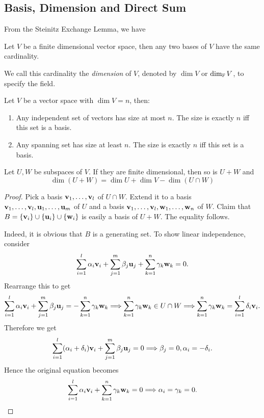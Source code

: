\documentclass[a4paper]{article}
\begin{document}
\subsection{Basis, Dimension and Direct Sum}
From the Steinitz Exchange Lemma, we have
\begin{corollary}\label{dim_well_defined}
    Let $V$ be a finite dimensional vector space, then any two bases of $V$ have the same cardinality.
\end{corollary}
We call this cardinality the \textit{dimension} of $V$, denoted by $ \dim V $ or $ \dim_{\mathbb{F}} V $, to specify the field.
\begin{corollary}
    Let $V$ be a vector space with $\dim V=n$, then:
    \begin{enumerate}
        \item Any independent set of vectors has size at most $n$.
        The size is exactly $n$ iff this set is a basis.
        \item Any spanning set has size at least $n$.
        The size is exactly $n$ iff this set is a basis.
    \end{enumerate}
\end{corollary}
\begin{proposition}
    Let $U,W$ be subspaces of $V$.
    If they are finite dimensional, then so is $U+W$ and
    $$\dim(U+W)=\dim U+\dim V-\dim(U\cap W)$$
\end{proposition}
\begin{proof}
    Pick a basis ${\bf v}_1,\ldots,{\bf v}_l$ of $U\cap W$.
    Extend it to a basis ${\bf v}_1,\ldots,{\bf v}_l,{\bf u}_1,\ldots,{\bf u}_m$ of $U$ and a basis ${\bf v}_1,\ldots,{\bf v}_l,{\bf w}_1,\ldots,{\bf w}_n$ of $W$. Claim that $B=\{{\bf v}_i\}\cup\{{\bf u}_i\}\cup\{{\bf w}_i\}$ is easily a basis of $U+W$.
    The equality follows.

    Indeed, it is obvious that $B$ is a generating set. To show linear independence, consider 
    \[
        \sum_{i=1}^{l}\alpha_i {\bf v}_i+\sum_{j=1}^{m}\beta_j {\bf u}_j+\sum_{k=1}^{n}\gamma_k{\bf w}_k=0.
    \]
    Rearrange this to get 
    \[
        \sum_{i=1}^{l}\alpha_i {\bf v}_i+\sum_{j=1}^{m}\beta_j {\bf u}_j=-\sum_{k=1}^{n}\gamma_k{\bf w}_k \Longrightarrow \sum_{k=1}^{n}\gamma_k{\bf w}_k\in U \cap W \Longrightarrow \sum_{k=1}^{n}\gamma_k{\bf w}_k=\sum_{i=1}^{l}\delta_i{\bf v}_i.
    \]
    Therefore we get 
    \[
        \sum_{i=1}^{l}(\alpha_i+\delta_i){\bf v}_i+\sum_{j=1}^{m}\beta_j {\bf u}_j=0 \Longrightarrow \beta_j=0,\alpha_i=-\delta_i.
    \]
    Hence the original equation becomes 
    \[
        \sum_{i=1}^{l}\alpha_i{\bf v}_i+\sum_{k=1}^{n}\gamma_k{\bf w}_k=0 \Longrightarrow \alpha_i=\gamma_k=0.\qedhere
    \]
\end{proof}
\end{document}
